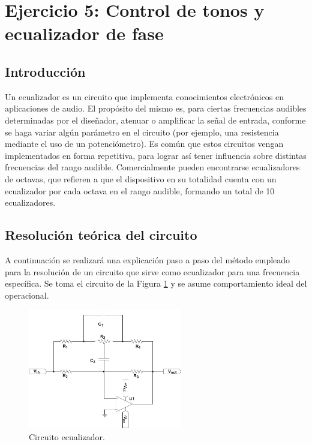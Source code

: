 \section{Ejercicio 5: Control de tonos y ecualizador de fase}
\subsection{Introducción} \label{sec:intro_ex5}
Un ecualizador es un circuito que implementa conocimientos electrónicos en aplicaciones de audio.
El propósito del mismo es, para ciertas frecuencias audibles determinadas por el diseñador, atenuar o amplificar la señal de entrada, 
conforme se haga variar algún parámetro en el circuito (por ejemplo, una resistencia mediante el uso de un potenciómetro).
Es común que estos circuitos vengan implementados en forma repetitiva, para lograr así tener influencia sobre distintas frecuencias del rango audible.
Comercialmente pueden encontrarse ecualizadores de octavas, que refieren a que el dispositivo en su totalidad cuenta con un ecualizador por cada octava en el rango audible,
formando un total de 10 ecualizadores.



\subsection{Resolución teórica del circuito}
A continuación se realizará una explicación paso a paso del método empleado para la resolución de un circuito que sirve como ecualizador para una frecuencia específica.
Se toma el circuito de la Figura \ref{fig:EQ_module} y se asume comportamiento ideal del operacional.
\begin{figure}[H]
    \centering
    \includegraphics[width=0.6\textwidth]{../EJ5/latex_resources/EQ_module}
    \caption{Circuito ecualizador.}
    \label{fig:EQ_module}
\end{figure}

